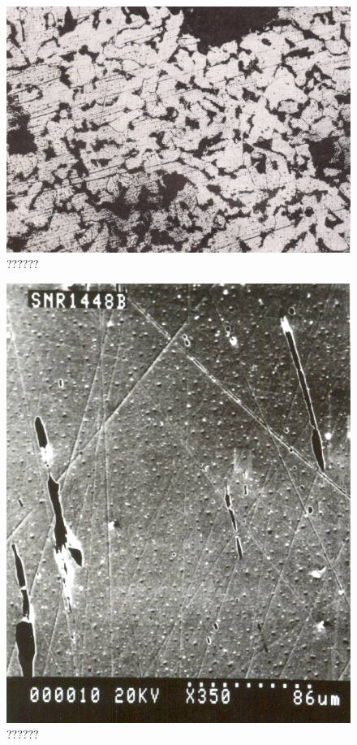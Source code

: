 \begin{figure}[H]
\renewcommand{\thefigure}{24C}
\includegraphics[scale=0.70]{images/chapter-4/fig024C.jpg}
\caption{??????}\label{chapter-4-fig24C}
\end{figure}


\begin{figure}[H]
\renewcommand{\thefigure}{25A}
\includegraphics[scale=0.75]{images/chapter-4/fig025A.jpg}
\caption{??????}\label{chapter-4-fig25A}
\end{figure}


